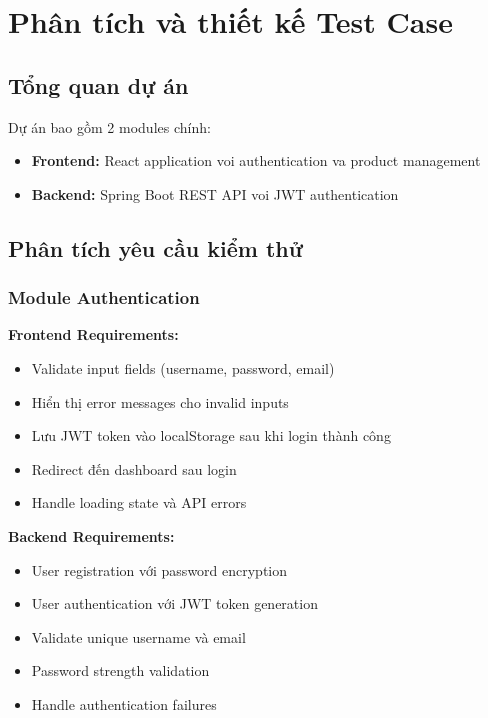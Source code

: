 \section{Phân tích và thiết kế Test Case}

\subsection{Tổng quan dự án}
Dự án bao gồm 2 modules chính:
\begin{itemize}
    \item \textbf{Frontend:} React application voi authentication va product management
    \item \textbf{Backend:} Spring Boot REST API voi JWT authentication
\end{itemize}

\subsection{Phân tích yêu cầu kiểm thử}

\subsubsection{Module Authentication}
\textbf{Frontend Requirements:}
\begin{itemize}
    \item Validate input fields (username, password, email)
    \item Hiển thị error messages cho invalid inputs
    \item Lưu JWT token vào localStorage sau khi login thành công
    \item Redirect đến dashboard sau login
    \item Handle loading state và API errors
\end{itemize}

\textbf{Backend Requirements:}
\begin{itemize}
    \item User registration với password encryption
    \item User authentication với JWT token generation
    \item Validate unique username và email
    \item Password strength validation
    \item Handle authentication failures
\end{itemize}

